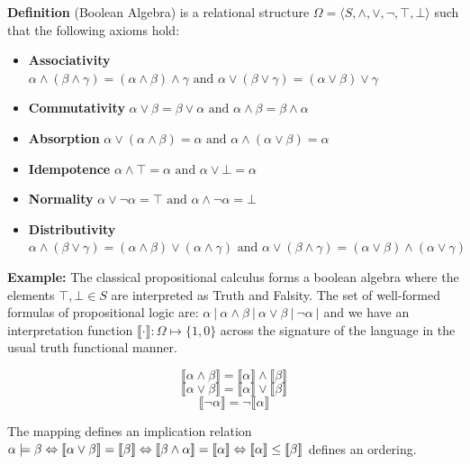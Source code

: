 \documentclass{tufte-handout}
\begin{document}
\begin{fullwidth}
\begin{example}
\textbf{Definition} (Boolean Algebra) is a relational structure $ \Omega = \langle S, \wedge, \vee, \neg, \top, \bot \rangle$ such that the following axioms hold: 

\begin{itemize}
\item \textbf{Associativity } $\alpha \wedge (\beta \wedge \gamma) = (\alpha \wedge \beta) \wedge \gamma \text{      and      }  \alpha \vee (\beta \vee \gamma) = (\alpha \vee \beta) \vee \gamma$

\item \textbf{Commutativity} $\alpha \vee \beta = \beta \vee \alpha \text{      and      }  \alpha \wedge \beta = \beta \wedge \alpha$

\item \textbf{Absorption}  $\alpha \vee (\alpha \wedge \beta) = \alpha  \text{      and      } \alpha \wedge (\alpha \vee \beta) = \alpha$

\item \textbf{Idempotence} $ \alpha \wedge \top = \alpha  \text{      and      } \alpha \vee \bot = \alpha$

\item \textbf{Normality} $\alpha \vee \neg\alpha = \top   \text{      and      } \alpha \wedge \neg\alpha = \bot $ 

\item \textbf{Distributivity} $\alpha \wedge (\beta \vee \gamma) = (\alpha \wedge \beta) \vee (\alpha \wedge \gamma) \text{      and      } \alpha \vee (\beta \wedge \gamma) = (\alpha \vee \beta) \wedge (\alpha \vee \gamma) $
\end{itemize}
\vspace{\baselineskip}

\textbf{Example:} The classical propositional calculus forms a boolean algebra where the elements ${\top, \bot \in S}$ are interpreted as Truth and Falsity. The set of well-formed formulas of propositional logic are: $\alpha \  | \  \alpha \wedge \beta \  | \  \alpha \vee \beta \  | \  \neg\alpha \ |$ and we have an interpretation function ${ \llbracket \cdot  \rrbracket : \Omega \mapsto \{1, 0 \}}$ across the signature of the language in the usual truth functional manner. 

$$ \llbracket \alpha \wedge \beta  \rrbracket  = \llbracket \alpha  \rrbracket \wedge \llbracket \beta  \rrbracket $$
$$ \llbracket \alpha \vee \beta  \rrbracket  = \llbracket \alpha  \rrbracket \vee \llbracket \beta  \rrbracket $$
$$ \llbracket \neg\alpha  \rrbracket  = \neg \llbracket \alpha  \rrbracket$$

The mapping defines an implication relation $ \alpha \models \beta  \Leftrightarrow  \llbracket \alpha \vee \beta \rrbracket  = \llbracket \beta \rrbracket   \Leftrightarrow \llbracket \beta \wedge \alpha \rrbracket = \llbracket \alpha \rrbracket  \\ \Leftrightarrow \llbracket \alpha \rrbracket \leq \llbracket \beta \rrbracket $ defines an ordering.
\end{example}
\end{fullwidth}
\end{document}
